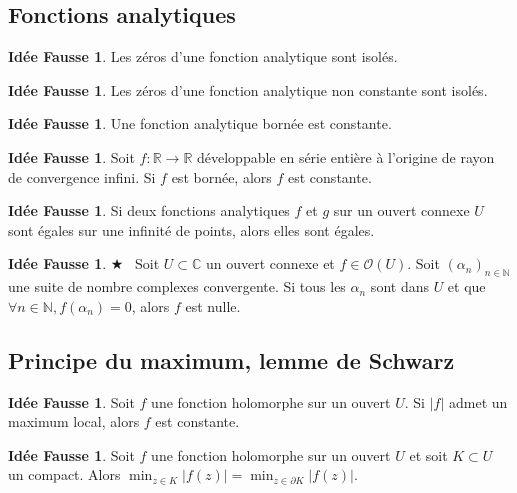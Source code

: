\documentclass[11pt,a4paper]{article}
\newcommand{\N}{\mathbb{N}}
\newcommand{\R}{\mathbb{R}}
\newcommand{\C}{\mathbb{C}}
\theoremstyle{definition}
\newtheorem{ideeFausse}[theoreme]{Idée Fausse}
\theoremstyle{plain}
\newcommand{\important}{$\bigstar$~}
\begin{document}
\subsection{Fonctions analytiques}

\begin{ideeFausse}
Les zéros d'une fonction analytique sont isolés.
\end{ideeFausse}

\begin{ideeFausse}
Les zéros d'une fonction analytique non constante sont isolés.
\end{ideeFausse}

\begin{ideeFausse}
Une fonction analytique bornée est constante.
\end{ideeFausse}



\begin{ideeFausse}
Soit $f : \R\to \R$ développable en série entière à l'origine de rayon de convergence infini. Si $f$ est bornée, alors $f$ est constante.
\end{ideeFausse}

\begin{ideeFausse}
Si deux fonctions analytiques $f$ et $g$ sur un ouvert connexe $U$ sont égales sur une infinité de points, alors elles sont égales.
\end{ideeFausse}

\begin{ideeFausse}\important
Soit $U\subset \C$ un ouvert connexe et $f\in \mathcal O(U)$.
Soit $(\alpha_n)_{n\in\N}$ une suite de nombre complexes convergente.
Si tous les $\alpha_n$ sont dans $U$ et que $\forall n\in \N, f(\alpha_n)=0$, alors $f$ est nulle.
\end{ideeFausse}

\subsection{Principe du maximum, lemme de Schwarz}

\begin{ideeFausse}
Soit $f$ une fonction holomorphe sur un ouvert $U$.
Si $|f|$ admet un maximum local, alors $f$ est constante.
\end{ideeFausse}


\begin{ideeFausse}
Soit $f$ une fonction holomorphe sur un ouvert $U$ et soit $K\subset U$ un compact.
Alors $\min_{z\in K} |f(z)| = \min_{z\in \partial K} |f(z)|$.
\end{ideeFausse}
\end{document}
